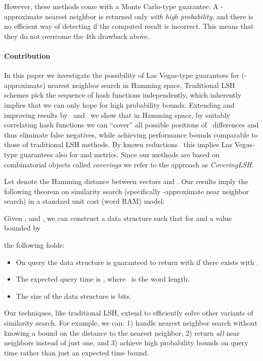 \documentclass[prodmode,acmtalg]{acmsmall}
\begin{document}
However, these methods come with a Monte Carlo-type guarantee:
A -approximate nearest neighbor is returned only \emph{with high probability}, and there is no efficient way of detecting if the computed result is incorrect.
This means that they do not overcome the 4th drawback above.

\medskip

\paragraph{Contribution}
In this paper we investigate the possibility of Las Vegas-type guarantees for (-approximate) nearest neighbor search in Hamming space.
Traditional LSH schemes pick the sequence of hash functions independently, 
which inherently implies that we can only hope for high probability bounds.
Extending and improving results by~\cite{greene1994multi} and~\cite{Arasu_VLDB06} we show that in Hamming space, by suitably correlating hash functions we can ``cover'' all possible positions of~ differences and thus eliminate false negatives, while achieving performance bounds comparable to those of traditional LSH methods.
By known reductions~\cite{DBLP:conf/stoc/Indyk07} this implies Las Vegas-type guarantees also for  and  metrics.
Since our methods are based on combinatorial objects called \emph{coverings} we refer to the approach as \emph{CoveringLSH}.

\medskip

Let  denote the Hamming distance between vectors  and .
Our results imply the following theorem on similarity search (specifically -approximate near neighbor search) in a standard unit cost (word RAM) model:

\begin{theorem}\label{thm:RAM}
Given ,  and , we can construct a data structure such that for  and a value  bounded by
		 		 
	the following holds:
		\begin{itemize}
		\item On query   the data structure is guaranteed to return  with  if there exists  with .
		 \item The expected query time is , where~ is the word length.
		 \item The size of the data structure is  bits.
		\end{itemize}
\end{theorem}

\medskip

Our techniques, like traditional LSH, extend to efficiently solve other variants of similarity search.
For example, we can: 1) handle nearest neighbor search without knowing a bound on the distance to the nearest neighbor, 2) return \emph{all} near neighbors instead of just one, and 3) achieve high probability bounds on query time rather than just an expected time bound. 
\end{document}
